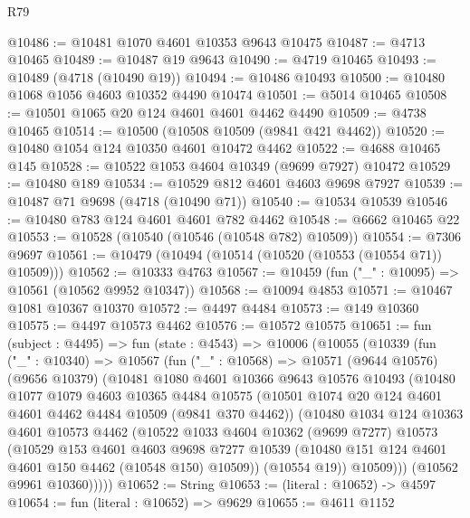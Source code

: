 \begin{lexlean}{R79}
\begin{coremodule}
@10486 := @10481 @1070 @4601 @10353 @9643 @10475
@10487 := @4713 @10465
@10489 := @10487 @19 @9643
@10490 := @4719 @10465
@10493 := @10489 (@4718 (@10490 @19))
@10494 := @10486 @10493
@10500 := @10480 @1068 @1056 @4603 @10352 @4490 @10474
@10501 := @5014 @10465
@10508 := @10501 @1065 @20 @124 @4601 @4601 @4462 @4490
@10509 := @4738 @10465
@10514 := @10500 (@10508 @10509 (@9841 @421 @4462))
@10520 := @10480 @1054 @124 @10350 @4601 @10472 @4462
@10522 := @4688 @10465 @145
@10528 := @10522 @1053 @4604 @10349 (@9699 @7927) @10472
@10529 := @10480 @189
@10534 := @10529 @812 @4601 @4603 @9698 @7927
@10539 := @10487 @71 @9698 (@4718 (@10490 @71))
@10540 := @10534 @10539
@10546 := @10480 @783 @124 @4601 @4601 @782 @4462
@10548 := @6662 @10465 @22
@10553 := @10528 (@10540 (@10546 (@10548 @782) @10509))
@10554 := @7306 @9697
@10561 := @10479 (@10494 (@10514 (@10520 (@10553 (@10554 @71)) @10509)))
@10562 := @10333 @4763
@10567 := @10459 (fun ("_" : @10095) => @10561 (@10562 @9952 @10347))
@10568 := @10094 @4853
@10571 := @10467 @1081 @10367 @10370
@10572 := @4497 @4484
@10573 := @149 @10360
@10575 := @4497 @10573 @4462
@10576 := @10572 @10575
@10651 := fun (subject : @4495) =>
  fun (state : @4543) =>
  @10006
    (@10055
      (@10339
        (fun ("_" : @10340) =>
        @10567
          (fun ("_" : @10568) =>
          @10571
            (@9644 @10576)
            (@9656 @10379)
            (@10481
              @1080
              @4601
              @10366
              @9643
              @10576
              @10493
              (@10480
                @1077
                @1079
                @4603
                @10365
                @4484
                @10575
                (@10501 @1074 @20 @124 @4601 @4601 @4462 @4484 @10509 (@9841 @370 @4462))
                (@10480
                  @1034
                  @124
                  @10363
                  @4601
                  @10573
                  @4462
                  (@10522
                    @1033
                    @4604
                    @10362
                    (@9699 @7277)
                    @10573
                    (@10529
                      @153
                      @4601
                      @4603
                      @9698
                      @7277
                      @10539
                      (@10480 @151 @124 @4601 @4601 @150 @4462 (@10548 @150) @10509))
                    (@10554 @19))
                  @10509)))
            (@10562 @9961 @10360)))))
@10652 := String
@10653 := (literal : @10652) -> @4597
@10654 := fun (literal : @10652) => @9629
@10655 := @4611 @1152

\end{coremodule}
\end{lexlean}
